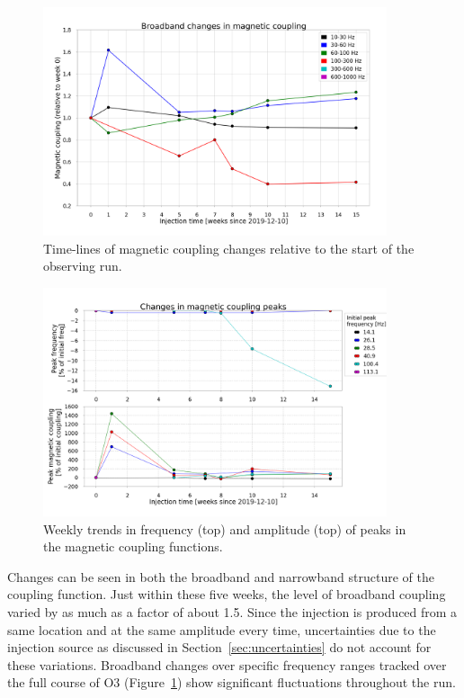 \begin{figure}
	\centering
	\includegraphics[width=0.9\textwidth]{figures/noise-studies/mag-weekly-bands.png}
	\caption{Time-lines of magnetic coupling changes relative to the start of the observing run.}
	\label{fig:mag-weekly-bands}
\end{figure}

\begin{figure}
	\includegraphics[width=0.9\textwidth]{figures/noise-studies/mag-weekly-peaks.png}
	\caption{Weekly trends in frequency (top) and amplitude (top) of peaks in the magnetic coupling functions.}
	\label{fig:mag-weekly-peaks}
\end{figure}

Changes can be seen in both the broadband and narrowband structure of the coupling function.
Just within these five weeks, the level of broadband coupling varied by as much as a factor of about 1.5.
Since the injection is produced from a same location and at the same amplitude every time, uncertainties due to the injection source as discussed in Section~\ref{sec:uncertainties} do not account for these variations.
Broadband changes over specific frequency ranges tracked over the full course of \ac{O3} (Figure~\ref{fig:mag-weekly-bands}) show significant fluctuations throughout the run.


